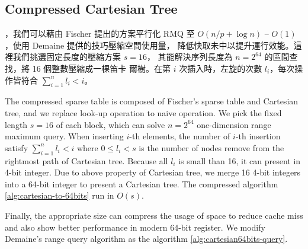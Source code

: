 \subsection{Compressed Cartesian Tree}

\iffalse 在 Fischer \cite{fischer} 的論文中，根據卡塔蘭數
$\frac{1}{s+1}\binom{2s}{s} = O(\frac{4^s}{s^{1.5}})$ 建立查找表
(lookup-table)，其中選擇 $s = \frac{1}{4} \log n$ 時，空間複雜度
$O(s^2 \frac{4^s}{s^{1.5}}) = o(n)$ 且建表複雜度 $o(n)$。每一個區間詢
問將會拆成 2 個 super-block 和 2 個 in-block 詢問，共計需要 4 次的記憶
體存取。在理論分析上，離線 RMQ 問題可在 $\theta(n)$ -- $\theta(1)$ 時
間內解決任一詢問。當 $n$ 越大時，這 4 次的記憶體存取會遭遇到嚴重的快取
未中 (cache miss)，在 Demaine ~\cite{demaine} 的論文中，發展出快取忘卻
(cache oblivious) 形式的查找方案，降低在離線版本中的 in-block 詢問產生
的快取未中。\fi


，我們可以藉由 Fischer 提出的方案平行化 RMQ 至
$O(n / p + \log n)$ -- $O(1)$，使用 Demaine 提供的技巧壓縮空間使用量，
降低快取未中以提升運行效能。這裡我們挑選固定長度的壓縮方案 $s = 16$，
其能解決序列長度為 $n = 2^{64}$ 的區間查找，將 16 個整數壓縮成一棵笛卡
爾樹。在第 $i$ 次插入時，左旋的次數 $l_i$，每次操作皆符合
$\sum_{i=1}^{n} l_i < i$。\fi

The compressed sparse table is composed of Fischer's sparse table and
Cartesian tree, and we replace look-up operation to naive operation.
We pick the fixed length $s = 16$ of each block, which can solve $n =
2^{64}$ one-dimension range maximum query.  When inserting $i$-th
elements, the number of $i$-th insertion satisfy $\sum_{i=1}^{n} l_i <
i$ where $0 \le l_i < s$ is the number of nodes remove from the
rightmost path of Cartesian tree.  Because all $l_i$ is small than 16,
it can present in 4-bit integer.  Due to above property of Cartesian
tree, we merge 16 4-bit integers into a 64-bit integer to present a
Cartesian tree. The compressed algorithm
\ref{alg:cartesian-to-64bits} run in $O(s)$.




Finally, the appropriate size can compress the usage of space to
reduce cache miss and also show better performance in modern 64-bit
register.  We modify Demaine's range query algorithm as the algorithm
\ref{alg:cartesian64bits-query}.



\iffalse
因所有 $l_i < 16$，使得每個 $l_i$ 可用 4-bit 表示之，
整體便可用 64-bit 長整數表示一棵笛卡爾樹的狀態。
為了現在常見的 64-byte 快取列 (cache line) 和 64-bit 暫存器 (register) 考量，
我們選用合適的大小進行測試，不僅壓縮空間使用量，同時也減少快取未中的問題。
最後，我們得到壓縮算法 \ref{alg:cartesian-to-64bits}，其相對應的區間查找算法，
根據 Demaine \cite{demaine} 進行修改，得到壓縮下的詢問算法 \ref{alg:cartesian64bits-query}。
\fi

